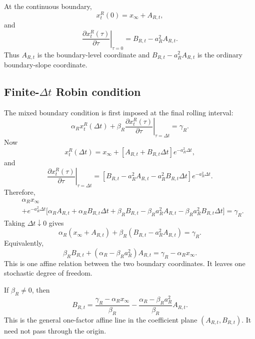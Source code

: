 \documentclass[12pt]{article}
\numberwithin{equation}{subsection}
\begin{document}
At the continuous boundary,
\begin{equation}
x^R_t(0)=x_\infty+A_{R,t},
\end{equation}
and
\begin{equation}
\left.\frac{\partial x^R_t(\tau)}{\partial\tau}\right|_{\tau=0}
=
B_{R,t}-a_R^2A_{R,t}.
\end{equation}
Thus $A_{R,t}$ is the boundary-level coordinate and $B_{R,t}-a_R^2A_{R,t}$ is the ordinary boundary-slope coordinate.

\subsection{Finite-$\Delta t$ Robin condition}

The mixed boundary condition is first imposed at the final rolling interval:
\begin{equation}
\alpha_R x^R_t(\Delta t)
+
\beta_R
\left.\frac{\partial x^R_t(\tau)}{\partial\tau}\right|_{\tau=\Delta t}
=
\gamma_R.
\end{equation}
Now
\begin{equation}
x^R_t(\Delta t)
=
x_\infty+
\left[A_{R,t}+B_{R,t}\Delta t\right]e^{-a_R^2\Delta t},
\end{equation}
and
\begin{equation}
\left.\frac{\partial x^R_t(\tau)}{\partial\tau}\right|_{\tau=\Delta t}
=
\left[
B_{R,t}-a_R^2A_{R,t}-a_R^2B_{R,t}\Delta t
\right]e^{-a_R^2\Delta t}.
\end{equation}
Therefore,
\begin{equation}
\begin{aligned}
&\alpha_Rx_\infty
\\
&+e^{-a_R^2\Delta t}
\Big[
\alpha_RA_{R,t}
+\alpha_RB_{R,t}\Delta t
+\beta_RB_{R,t}
-\beta_Ra_R^2A_{R,t}
-\beta_Ra_R^2B_{R,t}\Delta t
\Big]
=
\gamma_R.
\end{aligned}
\end{equation}
Taking $\Delta t\downarrow0$ gives
\begin{equation}
\alpha_R(x_\infty+A_{R,t})
+
\beta_R(B_{R,t}-a_R^2A_{R,t})
=
\gamma_R.
\end{equation}
Equivalently,
\begin{equation}
\beta_RB_{R,t}
+
(\alpha_R-\beta_Ra_R^2)A_{R,t}
=
\gamma_R-\alpha_Rx_\infty.
\end{equation}
This is one affine relation between the two boundary coordinates. It leaves one stochastic degree of freedom.

If $\beta_R\ne0$, then
\begin{equation}
\boxed{B_{R,t}
=
\frac{\gamma_R-\alpha_Rx_\infty}{\beta_R}
-
\frac{\alpha_R-\beta_Ra_R^2}{\beta_R}A_{R,t}.}
\end{equation}
This is the general one-factor affine line in the coefficient plane $(A_{R,t},B_{R,t})$. It need not pass through the origin.
\end{document}
